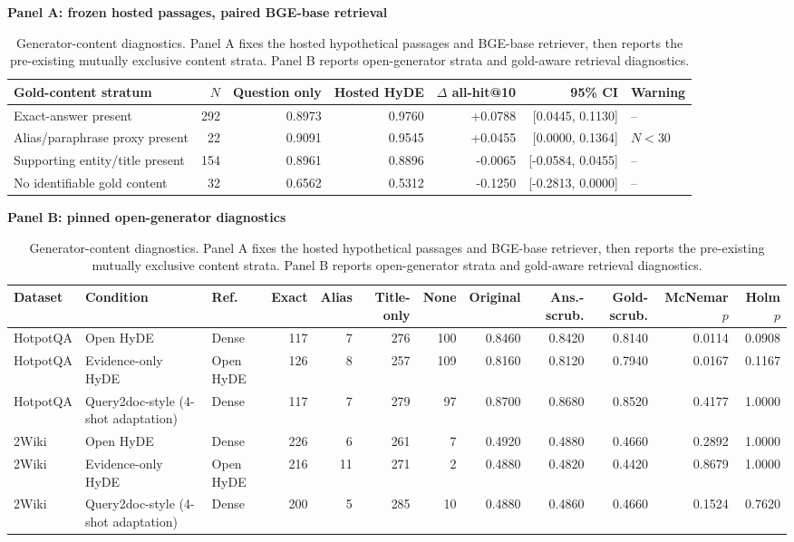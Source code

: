 \begin{table}
\centering
\caption{Generator-content diagnostics. Panel A fixes the hosted hypothetical passages and BGE-base retriever, then reports the pre-existing mutually exclusive content strata. Panel B reports open-generator strata and gold-aware retrieval diagnostics.}
\label{tab:open_generator_leakage}
\footnotesize
\setlength{\tabcolsep}{2.5pt}
\textbf{Panel A: frozen hosted passages, paired BGE-base retrieval}\\[2pt]
\begin{tabular}{lrrrrrl}
\toprule
Gold-content stratum & $N$ & Question only & Hosted HyDE & $\Delta$ all-hit@10 & 95\% CI & Warning \\
\midrule
Exact-answer present & 292 & 0.8973 & 0.9760 & +0.0788 & [0.0445, 0.1130] & -- \\
Alias/paraphrase proxy present & 22 & 0.9091 & 0.9545 & +0.0455 & [0.0000, 0.1364] & $N<30$ \\
Supporting entity/title present & 154 & 0.8961 & 0.8896 & -0.0065 & [-0.0584, 0.0455] & -- \\
No identifiable gold content & 32 & 0.6562 & 0.5312 & -0.1250 & [-0.2813, 0.0000] & -- \\
\bottomrule
\end{tabular}

\vspace{5pt}
\textbf{Panel B: pinned open-generator diagnostics}\\[2pt]
\begin{tabular}{lllrrrrrrrrr}
\toprule
Dataset & Condition & Ref. & Exact & Alias & Title-only & None & Original & Ans.-scrub. & Gold-scrub. & McNemar $p$ & Holm $p$ \\
\midrule
HotpotQA & Open HyDE & Dense & 117 & 7 & 276 & 100 & 0.8460 & 0.8420 & 0.8140 & 0.0114 & 0.0908 \\
HotpotQA & Evidence-only HyDE & Open HyDE & 126 & 8 & 257 & 109 & 0.8160 & 0.8120 & 0.7940 & 0.0167 & 0.1167 \\
HotpotQA & Query2doc-style (4-shot adaptation) & Dense & 117 & 7 & 279 & 97 & 0.8700 & 0.8680 & 0.8520 & 0.4177 & 1.0000 \\
\midrule
2Wiki & Open HyDE & Dense & 226 & 6 & 261 & 7 & 0.4920 & 0.4880 & 0.4660 & 0.2892 & 1.0000 \\
2Wiki & Evidence-only HyDE & Open HyDE & 216 & 11 & 271 & 2 & 0.4880 & 0.4820 & 0.4420 & 0.8679 & 1.0000 \\
2Wiki & Query2doc-style (4-shot adaptation) & Dense & 200 & 5 & 285 & 10 & 0.4880 & 0.4860 & 0.4660 & 0.1524 & 0.7620 \\
\bottomrule
\end{tabular}


\end{table}
